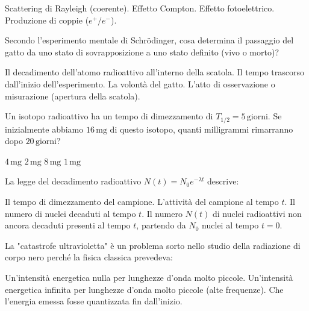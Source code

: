 \documentclass{exam}%
\begin{document}
\begin{questions}
\vspace{0.2em}%
\begin{multicols}{2}%
\begin{choices}%
\choice Scattering di Rayleigh (coerente).%
\choice Effetto Compton.%
\choice Effetto fotoelettrico.%
\choice Produzione di coppie ($e^+/e^-$).%
\end{choices}%
\end{multicols}%
\question Secondo l'esperimento mentale di Schrödinger, cosa determina il passaggio del gatto da uno stato di sovrapposizione a uno stato definito (vivo o morto)?%
\vspace{0.2em}%
\begin{choices}%
\choice Il decadimento dell'atomo radioattivo all'interno della scatola.%
\choice Il tempo trascorso dall'inizio dell'esperimento.%
\choice La volontà del gatto.%
\choice L'atto di osservazione o misurazione (apertura della scatola).%
\end{choices}%
\question Un isotopo radioattivo ha un tempo di dimezzamento di $T_{1/2} = 5 \, \text{giorni}$. Se inizialmente abbiamo $16 \, \text{mg}$ di questo isotopo, quanti milligrammi rimarranno dopo $20 \, \text{giorni}$?%
\vspace{0.2em}%
\begin{multicols}{4}%
\begin{choices}%
\choice $4 \, \text{mg}$%
\choice $2 \, \text{mg}$%
\choice $8 \, \text{mg}$%
\choice $1 \, \text{mg}$%
\end{choices}%
\end{multicols}%
\question La legge del decadimento radioattivo $N(t) = N_0 e^{-\lambda t}$ descrive:%
\vspace{0.2em}%
\begin{choices}%
\choice Il tempo di dimezzamento del campione.%
\choice L'attività del campione al tempo $t$.%
\choice Il numero di nuclei decaduti al tempo $t$.%
\choice Il numero $N(t)$ di nuclei radioattivi non ancora decaduti presenti al tempo $t$, partendo da $N_0$ nuclei al tempo $t=0$.%
\end{choices}%
\question La "catastrofe ultravioletta" è un problema sorto nello studio della radiazione di corpo nero perché la fisica classica prevedeva:%
\vspace{0.2em}%
\begin{choices}%
\choice Un'intensità energetica nulla per lunghezze d'onda molto piccole.%
\choice Un'intensità energetica infinita per lunghezze d'onda molto piccole (alte frequenze).%
\choice Che l'energia emessa fosse quantizzata fin dall'inizio.%

\end{choices}
\end{questions}
\end{document}
